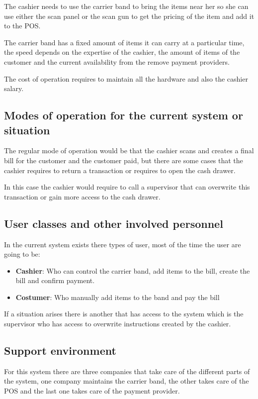 The cashier needs to use the carrier band to bring the items near her so she 
can use either the scan panel or the scan gun to get the pricing of the item 
and add it to the POS.\newline

The carrier band has a fixed amount of items it can carry at a particular time, 
the speed depends on the expertise of the cashier, the amount of items of the 
customer and the current availability from the 
remove payment providers.\newline

The cost of operation requires to maintain all the hardware and also the 
cashier salary.

\subsection{Modes of operation for the current system or situation}
The regular mode of operation would be that the cashier scans and creates a 
final bill for the customer and the customer paid, but there are some 
cases that the cashier requires to return a transaction or requires to open 
the cash drawer. \newline

In this case the cashier would require to call a supervisor that can overwrite 
this transaction or gain more access to the cash drawer. \newline

\pagebreak

\subsection{User classes and other involved personnel}
In the current system exists there types of user, most of the time the user 
are going to be:

\begin{itemize}
	\item \textbf{Cashier}: Who can control the carrier band, add items to the 
    bill, create the bill and confirm payment.
	\item \textbf{Costumer}: Who manually add items to the band and pay the bill
\end{itemize}

If a situation arises there is another that has access to the system which is 
the supervisor who has access to overwrite instructions created by the cashier.

\subsection{Support environment}
For this system there are three companies that take care of the different 
parts of the system, one company maintains the carrier band, the other takes 
care of the POS and the last one takes care of the payment provider.